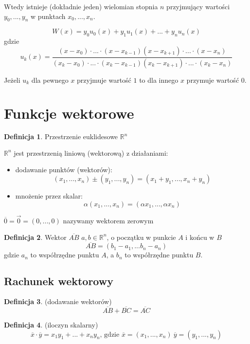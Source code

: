 \documentclass{article}
\theoremstyle{definition}
\newtheorem{de}{Definicja}[subsection]
\theoremstyle{definition}
\theoremstyle{definition}
\begin{document}
Wtedy istnieje (dokładnie jeden) wielomian stopnia $n$ przyjmujący wartości 
$y_0,...,y_n$ w punktach $x_0,...,x_n$.

$$
W(x) = y_0u_0(x) + y_1u_1(x) +...+ y_nu_n(x)
$$
gdzie
$$
u_k(x) = \frac
{(x-x_0)\cdot...\cdot(x-x_{k-1})(x-x_{k+1})\cdot...\cdot(x-x_n)}
{(x_k-x_0)\cdot...\cdot(x_k-x_{k-1})(x_k-x_{k+1})\cdot...\cdot(x_k-x_n)}
$$

Jeżeli $u_k$ dla pewnego $x$ przyjmuje wartość $1$ to dla innego $x$
przymuje wartość $0$.

\section{Funkcje wektorowe}

\begin{de}
Przestrzenie euklidesowe $\mathbb{R}^n$

$\mathbb{R}^n$ jest przestrzenią liniową (wektorową) z działaniami:
\begin{itemize}
\item dodawanie punktów (wektorów):
      $$
      (x_1,...,x_n) \pm (y_1,...,y_n) = (x_1+y_1,...,x_n+y_n)
      $$
\item mnożenie przez skalar:
      $$
      \alpha (x_1,...,x_n) = (\alpha x_1,...,\alpha x_n)
      $$
\end{itemize}

$\overline{0} = \vec{0} = (0,...,0)$ nazywamy wektorem zerowym
\end{de}

\begin{de}
Wektor $\overline{AB}$ $a,b \in \mathbb{R}^n$, o początku w punkcie $A$ i końcu
w $B$
$$
\overline{AB} = (b_1-a_1,...b_n-a_n)
$$
gdzie $a_n$ to współrzędne punktu $A$, a $b_n$ to współrzędne punktu $B$.
\end{de}

\subsection{Rachunek wektorowy}

\begin{de}
(dodawanie wektorów)
$$
\overline{AB}+\overline{BC}=\overline{AC}
$$
\end{de}

\begin{de}
(iloczyn skalarny)
$$
\overline{x} \cdot \overline{y} = x_1y_1+...+x_ny_n
\text{, gdzie }
\overline{x} = (x_1,...,x_n) \ 
\overline{y} = (y_1,...,y_n)
$$
\end{de}
\end{document}
